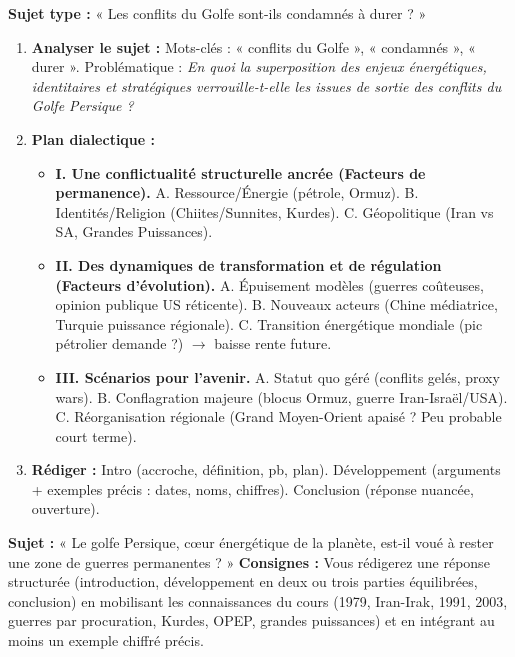 \documentclass[11pt]{article}
\begin{document}
\begin{methode}
\textbf{Sujet type :} « Les conflits du Golfe sont-ils condamnés à durer ? »
\begin{enumerate}
    \item \textbf{Analyser le sujet :} Mots-clés : « conflits du Golfe », « condamnés », « durer ». Problématique : \emph{En quoi la superposition des enjeux énergétiques, identitaires et stratégiques verrouille-t-elle les issues de sortie des conflits du Golfe Persique ?}
    \item \textbf{Plan dialectique :}
    \begin{itemize}
        \item \textbf{I. Une conflictualité structurelle ancrée (Facteurs de permanence).} A. Ressource/Énergie (pétrole, Ormuz). B. Identités/Religion (Chiites/Sunnites, Kurdes). C. Géopolitique (Iran vs SA, Grandes Puissances).
        \item \textbf{II. Des dynamiques de transformation et de régulation (Facteurs d'évolution).} A. Épuisement modèles (guerres coûteuses, opinion publique US réticente). B. Nouveaux acteurs (Chine médiatrice, Turquie puissance régionale). C. Transition énergétique mondiale (pic pétrolier demande ?) $\rightarrow$ baisse rente future.
        \item \textbf{III. Scénarios pour l'avenir.} A. Statut quo géré (conflits gelés, proxy wars). B. Conflagration majeure (blocus Ormuz, guerre Iran-Israël/USA). C. Réorganisation régionale (Grand Moyen-Orient apaisé ? Peu probable court terme).
    \end{itemize}
    \item \textbf{Rédiger :} Intro (accroche, définition, pb, plan). Développement (arguments + exemples précis : dates, noms, chiffres). Conclusion (réponse nuancée, ouverture).
\end{enumerate}
\end{methode}

\begin{exercice}
\textbf{Sujet :} « Le golfe Persique, cœur énergétique de la planète, est-il voué à rester une zone de guerres permanentes ? »
\textbf{Consignes :} Vous rédigerez une réponse structurée (introduction, développement en deux ou trois parties équilibrées, conclusion) en mobilisant les connaissances du cours (1979, Iran-Irak, 1991, 2003, guerres par procuration, Kurdes, OPEP, grandes puissances) et en intégrant au moins un exemple chiffré précis.
\end{exercice}
\end{document}
